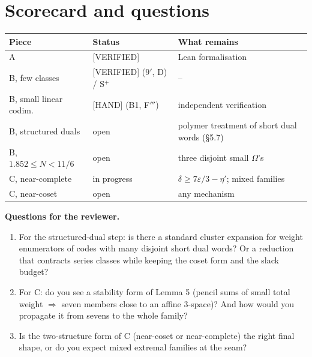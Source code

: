 \documentclass[11pt]{article}
\newcommand{\lvl}[1]{\textsf{\small[#1]}}
\begin{document}
\section{Scorecard and questions}
\begin{center}
\begin{tabular}{@{}lll@{}}
\toprule
Piece & Status & What remains \\
\midrule
A & \lvl{VERIFIED} & Lean formalisation \\
B, few classes & \lvl{VERIFIED} ($9'$, D) / S$^+$ & -- \\
B, small linear codim. & \lvl{HAND} (B1, F$'''$) & independent verification \\
B, structured duals & open & polymer treatment of short dual words (\S5.7) \\
B, $1.852\le N<11/6$ & open & three disjoint small $\Omega$'s \\
C, near-complete & in progress & $\delta\ge7\varepsilon/3-\eta'$; mixed families \\
C, near-coset & open & any mechanism \\
\bottomrule
\end{tabular}
\end{center}
\textbf{Questions for the reviewer.}
\begin{enumerate}
\item For the structured-dual step: is there a standard cluster expansion for weight enumerators of codes with many
disjoint short dual words? Or a reduction that contracts series classes while keeping the coset form and the slack
budget?
\item For C: do you see a stability form of Lemma 5 (pencil sums of small total weight $\Rightarrow$ seven members close to
an affine 3-space)? And how would you propagate it from sevens to the whole family?
\item Is the two-structure form of C (near-coset or near-complete) the right final shape, or do you expect mixed
extremal families at the seam?
\end{enumerate}
\end{document}
